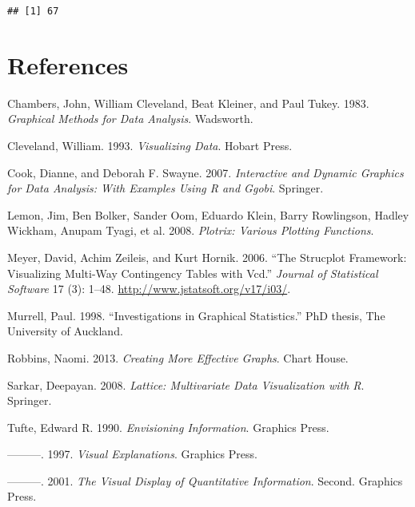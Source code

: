 \begin{verbatim}
## [1] 67
\end{verbatim}

\hypertarget{references}{%
\section*{References}\label{references}}

\hypertarget{refs}{}
\leavevmode\hypertarget{ref-chambers:1983}{}%
Chambers, John, William Cleveland, Beat Kleiner, and Paul Tukey. 1983.
\emph{Graphical Methods for Data Analysis}. Wadsworth.

\leavevmode\hypertarget{ref-cleveland:1993}{}%
Cleveland, William. 1993. \emph{Visualizing Data}. Hobart Press.

\leavevmode\hypertarget{ref-cook:2007}{}%
Cook, Dianne, and Deborah F. Swayne. 2007. \emph{Interactive and Dynamic
Graphics for Data Analysis: With Examples Using R and Ggobi}. Springer.

\leavevmode\hypertarget{ref-plotrix}{}%
Lemon, Jim, Ben Bolker, Sander Oom, Eduardo Klein, Barry Rowlingson,
Hadley Wickham, Anupam Tyagi, et al. 2008. \emph{Plotrix: Various
Plotting Functions}.

\leavevmode\hypertarget{ref-meyer:2006}{}%
Meyer, David, Achim Zeileis, and Kurt Hornik. 2006. ``The Strucplot
Framework: Visualizing Multi-Way Contingency Tables with Vcd.''
\emph{Journal of Statistical Software} 17 (3): 1--48.
\url{http://www.jstatsoft.org/v17/i03/}.

\leavevmode\hypertarget{ref-murrell:1998}{}%
Murrell, Paul. 1998. ``Investigations in Graphical Statistics.''
PhD thesis, The University of Auckland.

\leavevmode\hypertarget{ref-robbins:2004}{}%
Robbins, Naomi. 2013. \emph{Creating More Effective Graphs}. Chart
House.

\leavevmode\hypertarget{ref-sarkar:2008}{}%
Sarkar, Deepayan. 2008. \emph{Lattice: Multivariate Data Visualization
with R}. Springer.

\leavevmode\hypertarget{ref-tufte:1990}{}%
Tufte, Edward R. 1990. \emph{Envisioning Information}. Graphics Press.

\leavevmode\hypertarget{ref-tufte:1997}{}%
---------. 1997. \emph{Visual Explanations}. Graphics Press.

\leavevmode\hypertarget{ref-tufte:2001}{}%
---------. 2001. \emph{The Visual Display of Quantitative Information}.
Second. Graphics Press.

